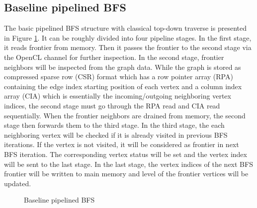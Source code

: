 \subsection{Baseline pipelined BFS}
The basic pipelined BFS structure with classical top-down traverse 
is presented in Figure \ref{fig:base-bfs}. It can be roughly 
divided into four pipeline stages. In the first stage, it reads 
frontier from memory. Then it passes the frontier to the second stage
via the OpenCL channel for further inspection. In the second stage, 
frontier neighbors will be inspected from the graph data. While the 
graph is stored as compressed sparse row (CSR) format which has a row 
pointer array (RPA) containing the edge index starting position of each 
vertex and a column index array (CIA) which is essentially the incoming/outgoing 
neighboring vertex indices, the second stage must go through the RPA read and 
CIA read sequentially. When the frontier neighbors are 
drained from memory, the second stage then forwards them to the third stage.
In the third stage, the each neighboring vertex will be checked if it is 
already visited in previous BFS iterations. If the vertex is not visited, 
it will be considered as frontier in next BFS iteration. The corresponding 
vertex status will be set and the vertex index will be sent to the last stage.
In the last stage, the vertex indices of the next BFS frontier will be 
written to main memory and level of the frontier vertices will be updated.

\begin{figure}
    \caption{Baseline pipelined BFS}
\label{fig:base-bfs}
\vspace{-1em}
\end{figure}


